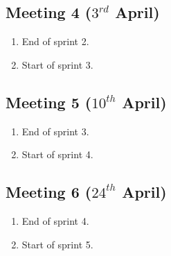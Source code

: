 \subsection{Meeting 4 ($3^{rd}$ April)}
\begin{enumerate}
	\item End of sprint 2.
	\item Start of sprint 3.
\end{enumerate}

\subsection{Meeting 5 ($10^{th}$ April)}
\begin{enumerate}
	\item End of sprint 3.
	\item Start of sprint 4.
\end{enumerate}

\subsection{Meeting 6 ($24^{th}$ April)}
\begin{enumerate}
	\item End of sprint 4.
	\item Start of sprint 5.
\end{enumerate}
